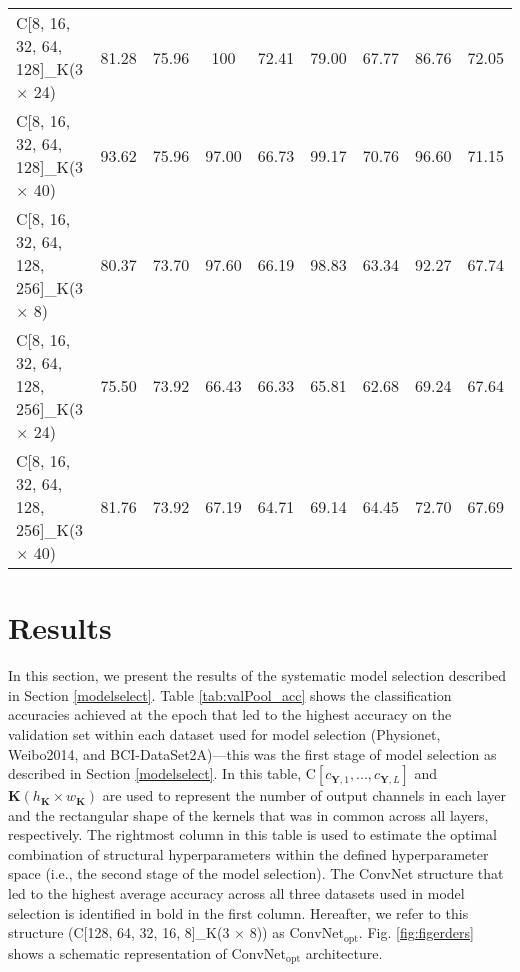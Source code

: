 \documentclass{ieeeaccess}
\begin{document}
{\begin{table*}[htb]
\begin{tabular}{|l|cc|cc|cc|cc|}
		C[8, 16, 32, 64, 128]\_K(3 $\times$ 24)      &      81.28 &       75.96 &       100 &            72.41 &      79.00 &      67.77 &      86.76 &      72.05 \\
		C[8, 16, 32, 64, 128]\_K(3 $\times$ 40)      &      93.62 &       75.96 &        97.00 &         66.73 &      99.17 &      70.76 &      96.60 &      71.15 \\
		C[8, 16, 32, 64, 128, 256]\_K(3 $\times$ 8)  &      80.37 &       73.70 &        97.60 &         66.19 &      98.83 &      63.34 &      92.27 &      67.74 \\
		C[8, 16, 32, 64, 128, 256]\_K(3 $\times$ 24) &      75.50 &       73.92 &        66.43 &         66.33 &      65.81 &      62.68 &      69.24 &      67.64 \\
		C[8, 16, 32, 64, 128, 256]\_K(3 $\times$ 40) &      81.76 &       73.92 &        67.19 &         64.71 &      69.14 &      64.45 &      72.70 &      67.69 \\
		\bottomrule
	\end{tabular}
\end{table*}    
    \section{Results} 
    \label{sec:results}
    
    In this section, we present the results of the systematic model selection described in Section \ref{modelselect}. Table \ref{tab:valPool_acc} shows the classification accuracies achieved at the epoch that led to the highest accuracy on the validation set within each dataset used for model selection (Physionet, Weibo2014, and BCI-DataSet2A)---this was the first stage of model selection as described in Section \ref{modelselect}. In this table, ${\text{C}}[c_{\mathbf{Y}, 1}, ..., c_{\mathbf{Y}, L}]$ and $\mathbf{\mathbf{K}}(h_{\mathbf{K}} \times w_{\mathbf{K}})$ are used to represent the number of output channels in each layer and the rectangular shape of the kernels that was in common across all layers, respectively. The rightmost column in this table is used to estimate the optimal combination of structural hyperparameters within the defined hyperparameter space (i.e., the second stage of the model selection). The ConvNet structure that led to the highest average accuracy across all three datasets used in model selection is identified in bold in the first column. Hereafter, we refer to this structure (C[128, 64, 32, 16, 8]\_K(3 $\times$ 8)) as $\text{ConvNet}_{\text{opt}}$. Fig. \ref{fig:figerders} shows a schematic representation of $\text{ConvNet}_{\text{opt}}$ architecture.
    
}
\end{document}
